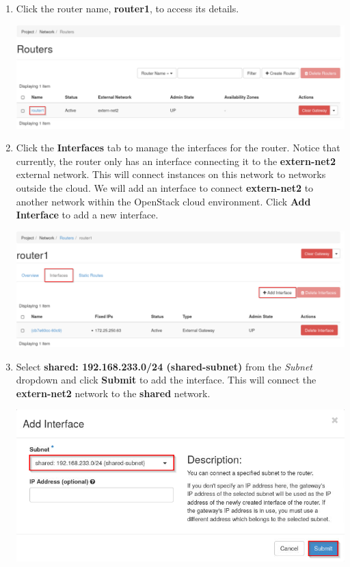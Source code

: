 \documentclass[letterpaper, 12pt]{article}
\begin{document}
\begin{enumerate}
    \item Click the router name, \textbf{router1}, to access its details.
    
    \begin{center}
        \includegraphics[width=\linewidth]{images/part2/step4.png}
    \end{center}

    \item Click the \textbf{Interfaces} tab to manage the interfaces for the router. Notice that currently, the router
    only has an interface connecting it to the \textbf{extern-net2} external network. This will connect instances on
    this network to networks outside the cloud. We will add an interface to connect \textbf{extern-net2} to another
    network within the OpenStack cloud environment. Click \textbf{Add Interface} to add a new interface.

    \begin{center}
        \includegraphics[width=\linewidth]{images/part2/step5.png}
    \end{center}

    \item Select \textbf{shared: 192.168.233.0/24 (shared-subnet)} from the \textit{Subnet} dropdown and click
    \textbf{Submit} to add the interface. This will connect the \textbf{extern-net2} network to the \textbf{shared}
    network.

    \begin{center}
        \includegraphics[width=\linewidth]{images/part2/step6.png}
    \end{center}


\end{enumerate}
\end{document}
